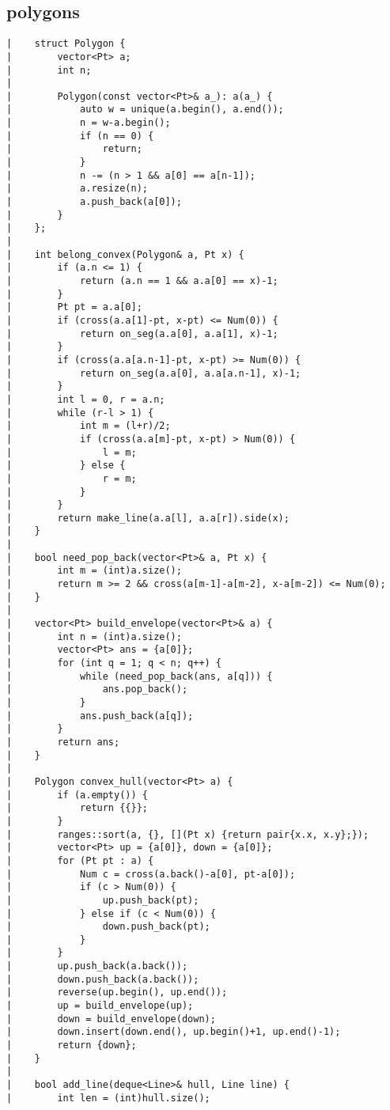 \documentclass[a4paper, 10pt]{article}
\begin{document}
\begin{center}
\section*{polygons}
\begin{verbatim}
|    struct Polygon {
|        vector<Pt> a;
|        int n;
|    
|        Polygon(const vector<Pt>& a_): a(a_) {
|            auto w = unique(a.begin(), a.end());
|            n = w-a.begin();
|            if (n == 0) {
|                return;
|            }
|            n -= (n > 1 && a[0] == a[n-1]);
|            a.resize(n);
|            a.push_back(a[0]);
|        }
|    };
|    
|    int belong_convex(Polygon& a, Pt x) {
|        if (a.n <= 1) {
|            return (a.n == 1 && a.a[0] == x)-1;
|        }
|        Pt pt = a.a[0];
|        if (cross(a.a[1]-pt, x-pt) <= Num(0)) {
|            return on_seg(a.a[0], a.a[1], x)-1;
|        }
|        if (cross(a.a[a.n-1]-pt, x-pt) >= Num(0)) {
|            return on_seg(a.a[0], a.a[a.n-1], x)-1;
|        }
|        int l = 0, r = a.n;
|        while (r-l > 1) {
|            int m = (l+r)/2;
|            if (cross(a.a[m]-pt, x-pt) > Num(0)) {
|                l = m;
|            } else {
|                r = m;
|            }
|        }
|        return make_line(a.a[l], a.a[r]).side(x);
|    }
|    
|    bool need_pop_back(vector<Pt>& a, Pt x) {
|        int m = (int)a.size();
|        return m >= 2 && cross(a[m-1]-a[m-2], x-a[m-2]) <= Num(0);
|    }
|    
|    vector<Pt> build_envelope(vector<Pt>& a) {
|        int n = (int)a.size();
|        vector<Pt> ans = {a[0]};
|        for (int q = 1; q < n; q++) {
|            while (need_pop_back(ans, a[q])) {
|                ans.pop_back();
|            }
|            ans.push_back(a[q]);
|        }
|        return ans;
|    }
|    
|    Polygon convex_hull(vector<Pt> a) {
|        if (a.empty()) {
|            return {{}};
|        }
|        ranges::sort(a, {}, [](Pt x) {return pair{x.x, x.y};});
|        vector<Pt> up = {a[0]}, down = {a[0]};
|        for (Pt pt : a) {
|            Num c = cross(a.back()-a[0], pt-a[0]);
|            if (c > Num(0)) {
|                up.push_back(pt);
|            } else if (c < Num(0)) {
|                down.push_back(pt);
|            }
|        }
|        up.push_back(a.back());
|        down.push_back(a.back());
|        reverse(up.begin(), up.end());
|        up = build_envelope(up);
|        down = build_envelope(down);
|        down.insert(down.end(), up.begin()+1, up.end()-1);
|        return {down};
|    }
|    
|    bool add_line(deque<Line>& hull, Line line) {
|        int len = (int)hull.size();

\end{verbatim}
\end{center}
\end{document}
